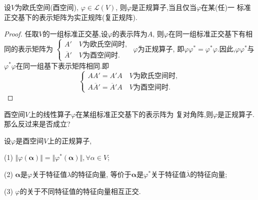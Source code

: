 \begin{theory}\label{thr:Complex-normal-operator1}
  设$V$为欧氏空间(酉空间), $\varphi\in \mathscr{L}(V)$,
  则$\varphi$是正规算子,当且仅当$\varphi$在某(任)一
  标准正交基下的表示矩阵为实正规阵(复正规阵).
\end{theory}

\begin{proof}
  任取$V$的一组标准正交基,设$\varphi$的表示阵为$A$,
  则$\varphi$在同一组标准正交基下有相同的表示矩阵为
  $\begin{cases} A'\quad V\text{为欧氏空间时},\\\overline{A}'
    \quad V\text{为酉空间时}.\end{cases}$ $\varphi$为正规算子,
  即$\varphi\varphi^*=\varphi^*\varphi$.因此,$\varphi\varphi^*$与
  $\varphi^*\varphi$在同一组基下表示矩阵相同.即
  \[
    \begin{cases}
      AA' = A'A \quad V\text{为欧氏空间时},\\
      A\overline{A}' = \overline{A}'A \quad V\text{为酉空间时}.
    \end{cases}
    \]
  \end{proof}

\begin{remark}
  酉空间$V$上的线性算子$\varphi$在某组标准正交基下的表示阵为
  复对角阵,则$\varphi$是正规算子.那么反过来是否成立?
\end{remark}

\begin{theory}\label{thr:Complex-normal-operator2}
  设$\varphi$是酉空间$V$上的正规算子,

  (1) $\Vert\varphi(\bm{\alpha})\Vert=\Vert\varphi^*(\bm{\alpha})\Vert,
  \forall \alpha \in V$;

  (2) $\bm{\alpha}$是$\varphi$关于特征值$\lambda$的特征向量,
  等价于$\bm{\alpha}$是$\varphi^*$关于特征值$\overline{\lambda}$的特征向量;

  (3) $\varphi$的关于不同特征值的特征向量相互正交.
\end{theory}

